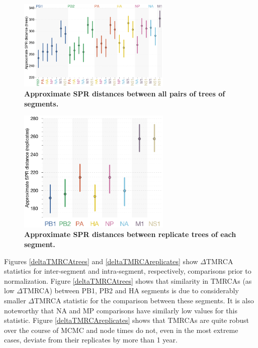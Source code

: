 \documentclass[11pt,oneside,letterpaper]{article}
\begin{document}
\begin{figure}
\centering  
\includegraphics[width=0.65\textwidth]  {supp_figures/InfB_supp_aSPRdistances_trees.png}
\caption{\textbf{Approximate SPR distances between all pairs of trees of segments.}}
\label{SPRdistancesTrees}
\end{figure}

\begin{figure}
\centering  
\includegraphics[width=0.65\textwidth]  {supp_figures/InfB_supp_aSPRdistances_replicates.png}
\caption{\textbf{Approximate SPR distances between replicate trees of each segment.}}
\label{SPRdistancesReplicates}
\end{figure}

Figures \ref{deltaTMRCAtrees} and \ref{deltaTMRCAreplicates} show $\Delta$TMRCA statistics for inter-segment and intra-segment, respectively, comparisons prior to normalization.
Figure \ref{deltaTMRCAtrees} shows that similarity in TMRCAs (as low $\Delta$TMRCA) between PB1, PB2 and HA segments is due to considerably smaller $\Delta$TMRCA statistic for the comparison between these segments.
It is also noteworthy that NA and MP comparisons have similarly low values for this statistic.
Figure \ref{deltaTMRCAreplicates} shows that TMRCAs are quite robust over the course of MCMC and node times do not, even in the most extreme cases, deviate from their replicates by more than 1 year.
\end{document}
